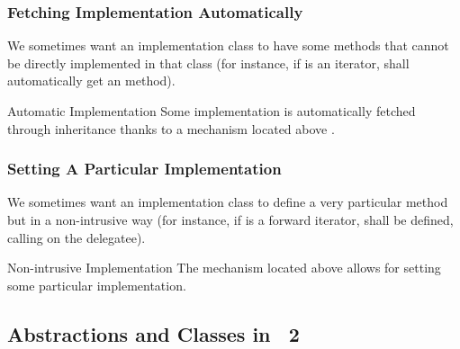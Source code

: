 \begin{frame}
  \frametitle{Fetching Implementation Automatically}

  We sometimes want an implementation class to have some methods that
  cannot be directly implemented in that class (for instance, if \bfI
  is an iterator, \bfreverseI shall automatically get an \bfisvalid
  method).

  \bigskip

\begin{block}{Automatic Implementation}
  Some implementation is automatically fetched through inheritance thanks
  to a mechanism located above \bftop.
\end{block}

\end{frame}



\begin{frame}
  \frametitle{Setting A Particular Implementation}

  We sometimes want an implementation class to define a very
  particular method but in a non-intrusive way (for instance, if
  \bfreverseI is a forward iterator, \bfnext shall be defined, calling
  \bfprev on the delegatee).

  \bigskip

\begin{block}{Non-intrusive Implementation}
  The mechanism located above \bftop allows for setting some
  particular implementation.
\end{block}

\end{frame}



\subsection{Abstractions and Classes in \scoop~2}


